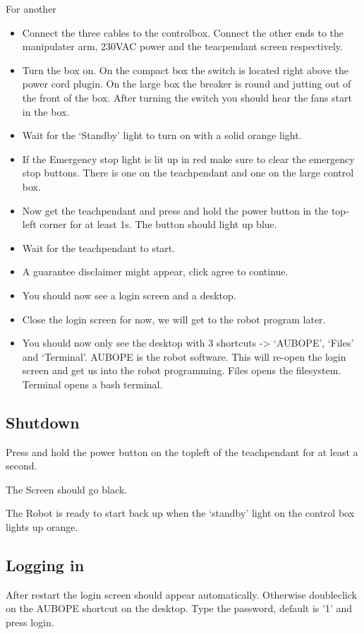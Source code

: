 \documentclass{article}
\begin{document}
For another 
\begin{itemize}
  \item Connect the three cables to the controlbox. Connect the other ends to the manipulater arm, 230VAC power and the teacpendant screen respectively.
  \item Turn the box on. On the compact box the switch is located right above the power cord plugin. On the large box the breaker is round and jutting out of the front of the box. After turning the switch you should hear the fans start in the box.
\item Wait for the ‘Standby’ light to turn on with a solid orange light. 
\item If the Emergency stop light is lit up in red make sure to clear the emergency stop buttons. There is one on the teachpendant and one on the large control box. 
\item Now get the teachpendant and press and hold the power button in the top-left corner for at least 1s. The button should light up blue.
\item Wait for the teachpendant to start. 
\item A guarantee disclaimer might appear, click agree to continue. 
\item You should now see a login screen and a desktop. 
\item Close the login screen for now, we will get to the robot program later. 
\item You should now only see the desktop with 3 shortcuts -> ‘AUBOPE’, ‘Files’ and ‘Terminal’. AUBOPE is the robot software. This will re-open the login screen and get us into the robot programming. Files opens the filesystem. Terminal opens a bash terminal.
\end{itemize}

\subsection{Shutdown} 
Press and hold the power button on the topleft of the teachpendant for at least a second.

The Screen should go black. 

The Robot is ready to start back up when the ‘standby’ light on the control box lights up orange. 

\subsection{Logging in}
\label{subsec:login}
After restart the login screen should appear automatically. Otherwise doubleclick on the AUBOPE shortcut on the desktop. Type the password, default is '1' and press login. 
\end{document}
